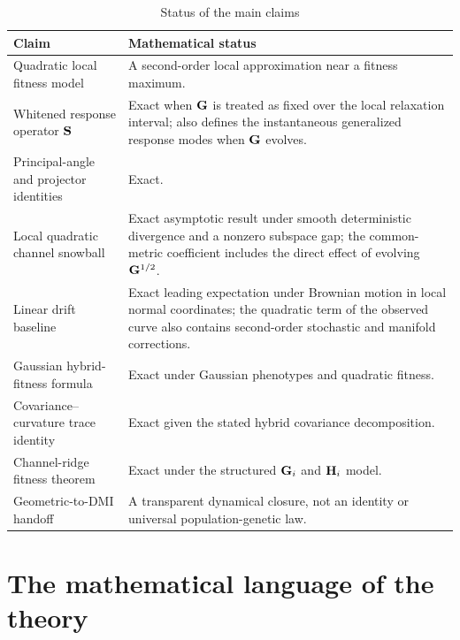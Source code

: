 \begin{table}[H]
\centering
\caption*{Status of the main claims}
\begin{tabularx}{\textwidth}{@{}p{}X@{}}
\toprule
Claim & Mathematical status \\
\midrule
Quadratic local fitness model & A second-order local approximation near a fitness maximum. \\
Whitened response operator \(\mathbf{S}\) & Exact when \(\mathbf{G}\) is treated as fixed over the local relaxation interval; also defines the instantaneous generalized response modes when \(\mathbf{G}\) evolves. \\
Principal-angle and projector identities & Exact. \\
Local quadratic channel snowball & Exact asymptotic result under smooth deterministic divergence and a nonzero subspace gap; the common-metric coefficient includes the direct effect of evolving \(\mathbf{G}^{1/2}\). \\
Linear drift baseline & Exact leading expectation under Brownian motion in local normal coordinates; the quadratic term of the observed curve also contains second-order stochastic and manifold corrections. \\
Gaussian hybrid-fitness formula & Exact under Gaussian phenotypes and quadratic fitness. \\
Covariance--curvature trace identity & Exact given the stated hybrid covariance decomposition. \\
Channel-ridge fitness theorem & Exact under the structured \(\mathbf{G}_i\) and \(\mathbf{H}_i\) model. \\
Geometric-to-DMI handoff & A transparent dynamical closure, not an identity or universal population-genetic law. \\
\bottomrule
\end{tabularx}
\end{table}

\tableofcontents
\clearpage
{}

\part{The mathematical language of the theory}
